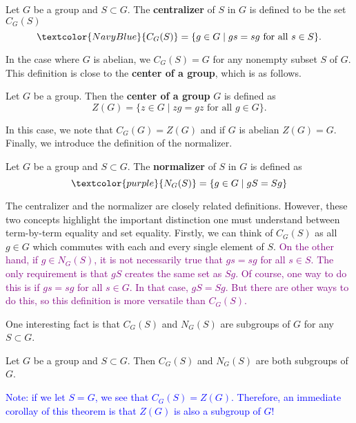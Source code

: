 \documentclass[12pt,letterpaper]{algebra_book}
\theoremstyle{definition}
\begin{document}
    \begin{definition}
        Let $G$ be a group and $S \subset G$. The \textbf{centralizer}
        of $S$ in $G$ is defined to be the set $C_G(S)$
        \[
            \textcolor{NavyBlue}{C_G(S)} = \{g \in G \mid gs = sg \text{ for all } s \in S\}.
        \]
    \end{definition}
    In the case where $G$ is abelian, we $C_G(S) = G$ for any nonempty
    subset $S$ of $G$. This definition is close to the \textbf{center
    of a group}, which is as follows.

    \begin{definition}
        Let $G$ be a group. Then the \textbf{center of a group} $G$ is
        defined as 
        \[
            Z(G) = \{z \in G \mid zg = gz \text{ for all } g \in G\}.
        \]
    \end{definition}

    In this case, we note that $C_G(G) = Z(G)$ and if $G$ is abelian
    $Z(G) = G$. Finally, we introduce the definition of the
    normalizer.
    
    \begin{definition}
        Let $G$ be a group and $S \subset G$. The \textbf{normalizer}
        of $S$ in $G$ is defined as 
        \[
            \textcolor{purple}{N_G(S)} = \{g \in G \mid gS = Sg\}
        \]
    \end{definition}
    
    The centralizer and the normalizer are closely related
    definitions. However, these two concepts highlight the important
    distinction one must understand between term-by-term equality and
    set equality. \textcolor{NavyBlue}{Firstly, we can think of $C_G(S)$ as all $g \in G$
    which commutes with each and every single element of $S$.} 
    \textcolor{purple}{On the
    other hand, if $g \in N_G(S)$, it is not necessarily true that $gs
    = sg$ for all $s \in S$. The only requirement is that $gS$
    creates the same set as $Sg$. Of course, one way to do this is
    if $gs = sg$ for all $s \in G$. In that case, $gS = Sg$. But there
    are other ways to do this, so this definition is more versatile
    than $C_G(S)$.}

    One interesting fact is that $C_G(S)$ and $N_G(S)$ are subgroups
    of $G$ for any $S \subset G$. 

    \begin{thm}
        Let $G$ be a group and $S \subset G$. Then $C_G(S)$ and
        $N_G(S)$ are both subgroups of $G$.
    \end{thm}
    \textcolor{blue}{Note: if we let $S = G$, we see that $C_G(S) =
    Z(G)$. 
    Therefore, an immediate corollay of this theorem is that $Z(G)$ is
    also a subgroup of $G$!}
\end{document}
